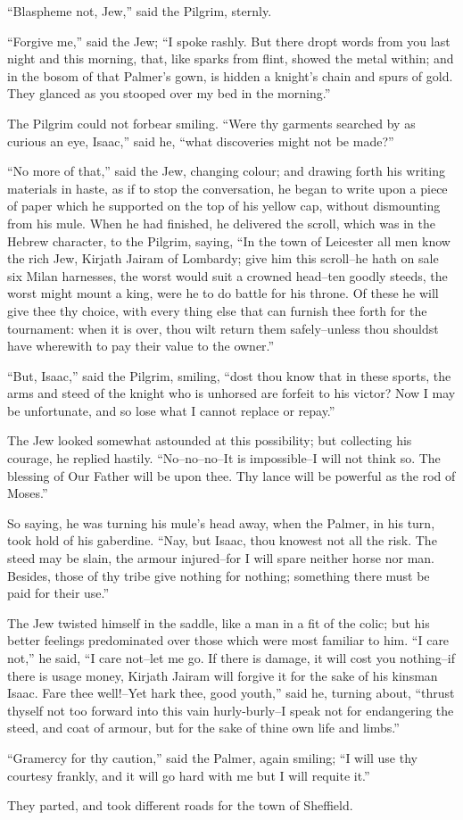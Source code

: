 ``Blaspheme not, Jew,'' said the Pilgrim, sternly.

``Forgive me,'' said the Jew; ``I spoke rashly. But there dropt words
from you last night and this morning, that, like sparks from flint,
showed the metal within; and in the bosom of that Palmer's gown, is
hidden a knight's chain and spurs of gold. They glanced as you stooped
over my bed in the morning.''

The Pilgrim could not forbear smiling. ``Were thy garments searched by
as curious an eye, Isaac,'' said he, ``what discoveries might not be
made?''

``No more of that,'' said the Jew, changing colour; and drawing forth
his writing materials in haste, as if to stop the conversation, he began
to write upon a piece of paper which he supported on the top of his
yellow cap, without dismounting from his mule. When he had finished, he
delivered the scroll, which was in the Hebrew character, to the Pilgrim,
saying, ``In the town of Leicester all men know the rich Jew, Kirjath
Jairam of Lombardy; give him this scroll--he hath on sale six Milan
harnesses, the worst would suit a crowned head--ten goodly steeds, the
worst might mount a king, were he to do battle for his throne. Of these
he will give thee thy choice, with every thing else that can furnish
thee forth for the tournament: when it is over, thou wilt return them
safely--unless thou shouldst have wherewith to pay their value to the
owner.''

``But, Isaac,'' said the Pilgrim, smiling, ``dost thou know that in
these sports, the arms and steed of the knight who is unhorsed are
forfeit to his victor? Now I may be unfortunate, and so lose what I
cannot replace or repay.''

The Jew looked somewhat astounded at this possibility; but collecting
his courage, he replied hastily. ``No--no--no--It is impossible--I will
not think so. The blessing of Our Father will be upon thee. Thy lance
will be powerful as the rod of Moses.''

So saying, he was turning his mule's head away, when the Palmer, in his
turn, took hold of his gaberdine. ``Nay, but Isaac, thou knowest not all
the risk. The steed may be slain, the armour injured--for I will spare
neither horse nor man. Besides, those of thy tribe give nothing for
nothing; something there must be paid for their use.''

The Jew twisted himself in the saddle, like a man in a fit of the colic;
but his better feelings predominated over those which were most familiar
to him. ``I care not,'' he said, ``I care not--let me go. If there is
damage, it will cost you nothing--if there is usage money, Kirjath
Jairam will forgive it for the sake of his kinsman Isaac. Fare thee
well!--Yet hark thee, good youth,'' said he, turning about, ``thrust
thyself not too forward into this vain hurly-burly--I speak not for
endangering the steed, and coat of armour, but for the sake of thine own
life and limbs.''

``Gramercy for thy caution,'' said the Palmer, again smiling; ``I will
use thy courtesy frankly, and it will go hard with me but I will requite
it.''

They parted, and took different roads for the town of Sheffield.
